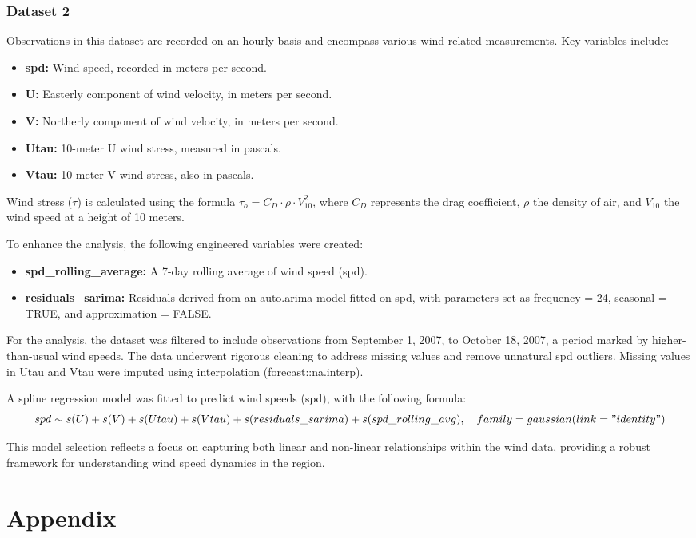 \documentclass[12pt, twoside,hidelinks]{article}
\theoremstyle{definition}
\numberwithin{equation}{section}
\begin{document}
\subsubsection*{Dataset 2}

Observations in this dataset are recorded on an hourly basis and encompass various wind-related measurements. Key variables include:

\begin{itemize}
    \item \textbf{spd:} Wind speed, recorded in meters per second.
    \item \textbf{U:} Easterly component of wind velocity, in meters per second.
    \item \textbf{V:} Northerly component of wind velocity, in meters per second.
    \item \textbf{Utau:} 10-meter U wind stress, measured in pascals.
    \item \textbf{Vtau:} 10-meter V wind stress, also in pascals.
\end{itemize}

Wind stress (\(\tau\)) is calculated using the formula \(\tau_o = C_D \cdot \rho \cdot V_{10}^2\), where \(C_D\) represents the drag coefficient, \(\rho\) the density of air, and \(V_{10}\) the wind speed at a height of 10 meters.
\newline

To enhance the analysis, the following engineered variables were created:
\begin{itemize}
    \item \textbf{spd\_rolling\_average:} A 7-day rolling average of wind speed (spd).
    \item \textbf{residuals\_sarima:} Residuals derived from an auto.arima model fitted on spd, with parameters set as frequency = 24, seasonal = TRUE, and approximation = FALSE.
\end{itemize}


For the analysis, the dataset was filtered to include observations from September 1, 2007, to October 18, 2007, a period marked by higher-than-usual wind speeds. The data underwent rigorous cleaning to address missing values and remove unnatural spd outliers. Missing values in Utau and Vtau were imputed using interpolation (forecast::na.interp).
\newline

A spline regression model was fitted to predict wind speeds (spd), with the following formula:
\begin{equation}
    spd \sim s(U) + s(V) + s(Utau) + s(Vtau) + s(residuals\_sarima) + s(spd\_rolling\_avg), \quad family = gaussian(link = "identity")
\end{equation}

This model selection reflects a focus on capturing both linear and non-linear relationships within the wind data, providing a robust framework for understanding wind speed dynamics in the region.

\newpage












\section{Appendix}





\end{document}
